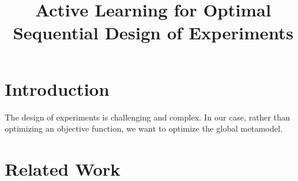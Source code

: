 \documentclass[conference]{IEEEtran}
\begin{document}
	
	
	\title{\LARGE \textbf{Active Learning for Optimal Sequential Design of Experiments}
	}
	
	
	\author{
		} %
	
	
	\maketitle
	
	\begin{abstract}
	\end{abstract}
	
	
	\section{Introduction}
	\label{sec:introduction}
	
	
	The design of experiments is challenging and complex. In our case, rather than optimizing an objective function, we want to optimize the global metamodel.
	
	
	
	
	
	
	\section{Related Work}
	\label{sec:related-work}
	
\end{document}
